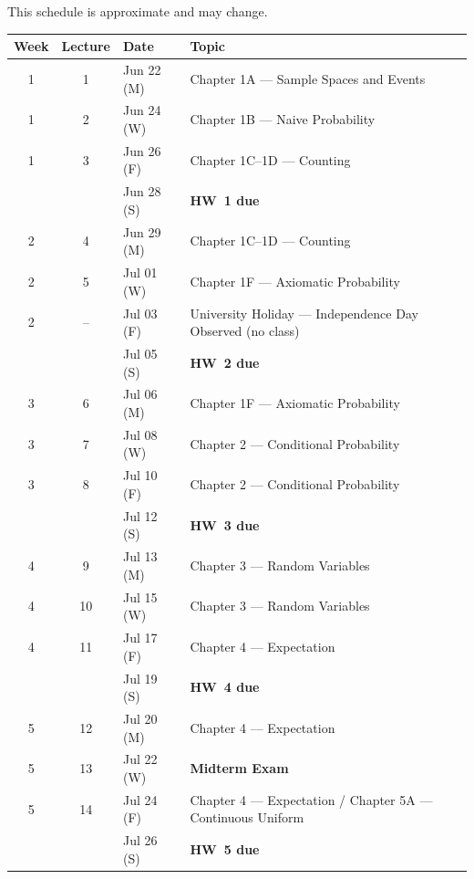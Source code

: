 \documentclass[11pt]{article}
\begin{document}
This schedule is approximate and may change.

\begin{longtable}{@{}cclp{}@{}}
\toprule
\textbf{Week} & \textbf{Lecture} & \textbf{Date} & \textbf{Topic} \\
\midrule
\endhead

1 & 1  & Jun 22 (M) & Chapter 1A --- Sample Spaces and Events \\
1 & 2  & Jun 24 (W) & Chapter 1B --- Naive Probability \\
1 & 3  & Jun 26 (F) & Chapter 1C--1D --- Counting \\
  &    & Jun 28 (S) & \textbf{\textcolor{uwpurple}{HW~1 due}} \\

2 & 4  & Jun 29 (M) & Chapter 1C--1D --- Counting \\
2 & 5  & Jul 01 (W) & Chapter 1F --- Axiomatic Probability \\
2 & -- & Jul 03 (F) & University Holiday --- Independence Day Observed (no class) \\
  &    & Jul 05 (S) & \textbf{\textcolor{uwpurple}{HW~2 due}} \\

3 & 6  & Jul 06 (M) & Chapter 1F --- Axiomatic Probability \\
3 & 7  & Jul 08 (W) & Chapter 2 --- Conditional Probability \\
3 & 8  & Jul 10 (F) & Chapter 2 --- Conditional Probability \\
  &    & Jul 12 (S) & \textbf{\textcolor{uwpurple}{HW~3 due}} \\

4 & 9  & Jul 13 (M) & Chapter 3 --- Random Variables \\
4 & 10 & Jul 15 (W) & Chapter 3 --- Random Variables \\
4 & 11 & Jul 17 (F) & Chapter 4 --- Expectation \\
  &    & Jul 19 (S) & \textbf{\textcolor{uwpurple}{HW~4 due}} \\

5 & 12 & Jul 20 (M) & Chapter 4 --- Expectation \\
5 & 13 & Jul 22 (W) & \textbf{\textcolor{examcolor}{Midterm Exam}} \\
5 & 14 & Jul 24 (F) & Chapter 4 --- Expectation / Chapter 5A --- Continuous Uniform \\
  &    & Jul 26 (S) & \textbf{\textcolor{uwpurple}{HW~5 due}} \\


\end{longtable}
\end{document}
